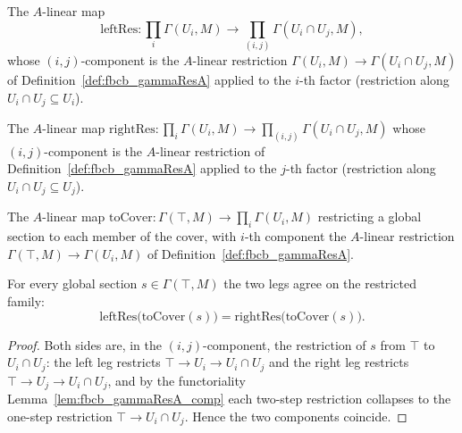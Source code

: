 \begin{definition}
  \label{def:fbcb_leftRes}
  The \(A\)-linear map
  \[
    \mathrm{leftRes} : \prod_i \Gamma(U_i, M) \longrightarrow \prod_{(i,j)} \Gamma(U_i \cap U_j, M),
  \]
  whose \((i,j)\)-component is the \(A\)-linear restriction \(\Gamma(U_i, M) \to \Gamma(U_i \cap U_j, M)\)
  of Definition~\ref{def:fbcb_gammaResA} applied to the \(i\)-th factor (restriction along
  \(U_i \cap U_j \subseteq U_i\)).
\end{definition}

\begin{definition}
  \label{def:fbcb_rightRes}
  The \(A\)-linear map \(\mathrm{rightRes} : \prod_i \Gamma(U_i, M) \to \prod_{(i,j)} \Gamma(U_i \cap U_j, M)\)
  whose \((i,j)\)-component is the \(A\)-linear restriction of Definition~\ref{def:fbcb_gammaResA} applied
  to the \(j\)-th factor (restriction along \(U_i \cap U_j \subseteq U_j\)).
\end{definition}

\begin{definition}
  \label{def:fbcb_toCover}
  The \(A\)-linear map \(\mathrm{toCover} : \Gamma(\top, M) \to \prod_i \Gamma(U_i, M)\) restricting a
  global section to each member of the cover, with \(i\)-th component the \(A\)-linear restriction
  \(\Gamma(\top, M) \to \Gamma(U_i, M)\) of Definition~\ref{def:fbcb_gammaResA}.
\end{definition}

\begin{lemma}
  \label{lem:fbcb_leftRes_toCover}
  For every global section \(s \in \Gamma(\top, M)\) the two legs agree on the restricted family:
  \[
    \mathrm{leftRes}\bigl(\mathrm{toCover}(s)\bigr) = \mathrm{rightRes}\bigl(\mathrm{toCover}(s)\bigr).
  \]
  \begin{proof}
    Both sides are, in the \((i,j)\)-component, the restriction of \(s\) from \(\top\) to
    \(U_i \cap U_j\): the left leg restricts \(\top \to U_i \to U_i \cap U_j\) and the right leg
    restricts \(\top \to U_j \to U_i \cap U_j\), and by the functoriality
    Lemma~\ref{lem:fbcb_gammaResA_comp} each two-step restriction collapses to the one-step restriction
    \(\top \to U_i \cap U_j\). Hence the two components coincide.
  \end{proof}
\end{lemma}

